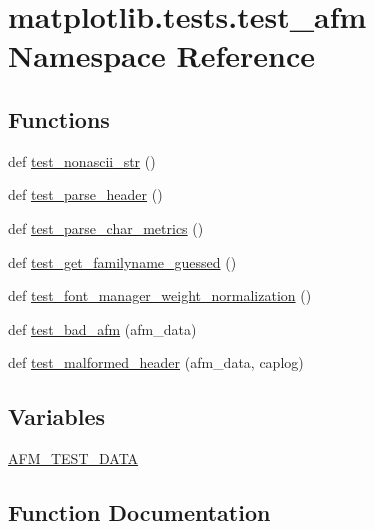 \hypertarget{namespacematplotlib_1_1tests_1_1test__afm}{}\section{matplotlib.\+tests.\+test\+\_\+afm Namespace Reference}
\label{namespacematplotlib_1_1tests_1_1test__afm}
\subsection*{Functions}
\begin{DoxyCompactItemize}
\item 
def \hyperlink{namespacematplotlib_1_1tests_1_1test__afm_acfb58fd1c263e3416f29787d6aa97770}{test\+\_\+nonascii\+\_\+str} ()
\item 
def \hyperlink{namespacematplotlib_1_1tests_1_1test__afm_af50dab7fcd9f2808e37f1a42c2b36045}{test\+\_\+parse\+\_\+header} ()
\item 
def \hyperlink{namespacematplotlib_1_1tests_1_1test__afm_adaa81436a227f060860ade5cf1e09c8f}{test\+\_\+parse\+\_\+char\+\_\+metrics} ()
\item 
def \hyperlink{namespacematplotlib_1_1tests_1_1test__afm_a731c32d624da37767a9ecbb582ac510b}{test\+\_\+get\+\_\+familyname\+\_\+guessed} ()
\item 
def \hyperlink{namespacematplotlib_1_1tests_1_1test__afm_ad2a59783f45ed8a32a758fef3a2ff82a}{test\+\_\+font\+\_\+manager\+\_\+weight\+\_\+normalization} ()
\item 
def \hyperlink{namespacematplotlib_1_1tests_1_1test__afm_a3bd00d92b483817a457fbb23c25177b7}{test\+\_\+bad\+\_\+afm} (afm\+\_\+data)
\item 
def \hyperlink{namespacematplotlib_1_1tests_1_1test__afm_ae325cf45b8c33ffcd5dd859932598cf3}{test\+\_\+malformed\+\_\+header} (afm\+\_\+data, caplog)
\end{DoxyCompactItemize}
\subsection*{Variables}
\begin{DoxyCompactItemize}
\item 
\hyperlink{namespacematplotlib_1_1tests_1_1test__afm_a36eb9f31e8355d0618e942358ad955ab}{A\+F\+M\+\_\+\+T\+E\+S\+T\+\_\+\+D\+A\+TA}
\end{DoxyCompactItemize}


\subsection{Function Documentation}
\mbox{\label{namespacematplotlib_1_1tests_1_1test__afm_a3bd00d92b483817a457fbb23c25177b7}} 
